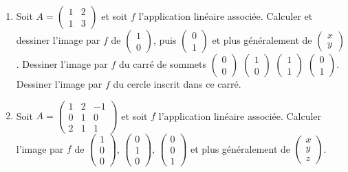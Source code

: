 \begin{frame}
\begin{miniexercice}
\begin{enumerate}
  \item Soit $A=\left(\begin{smallmatrix} 1 & 2 \\ 1 & 3 \end{smallmatrix} \right)$
  et soit $f$ l'application linéaire associée. Calculer et dessiner l'image par $f$ de 
  $\left(\begin{smallmatrix} 1 \\ 0 \end{smallmatrix} \right)$, puis
  $\left(\begin{smallmatrix} 0 \\ 1 \end{smallmatrix} \right)$
et plus généralement de $\left(\begin{smallmatrix} x \\ y \end{smallmatrix} \right)$.
Dessiner l'image par $f$ du carré de sommets 
$\left(\begin{smallmatrix} 0 \\ 0 \end{smallmatrix} \right)$
$\left(\begin{smallmatrix} 1 \\ 0 \end{smallmatrix} \right)$
$\left(\begin{smallmatrix} 1 \\ 1 \end{smallmatrix} \right)$
$\left(\begin{smallmatrix} 0 \\ 1 \end{smallmatrix} \right)$.
Dessiner l'image par $f$ du cercle inscrit dans ce carré.
  
  \item Soit $A=\left(\begin{smallmatrix} 1 & 2 & -1 \\ 0 & 1 & 0 \\ 2 & 1 & 1 \end{smallmatrix} \right)$
  et soit $f$ l'application linéaire associée. Calculer l'image par $f$ de 
  $\left(\begin{smallmatrix} 1 \\ 0 \\ 0 \end{smallmatrix} \right)$,
  $\left(\begin{smallmatrix} 0 \\ 1 \\ 0 \end{smallmatrix} \right)$,
  $\left(\begin{smallmatrix} 0 \\ 0 \\ 1 \end{smallmatrix} \right)$ 
et plus généralement de $\left(\begin{smallmatrix} x \\ y \\z \end{smallmatrix} \right)$.


\end{enumerate}
\end{miniexercice}
\end{frame}
